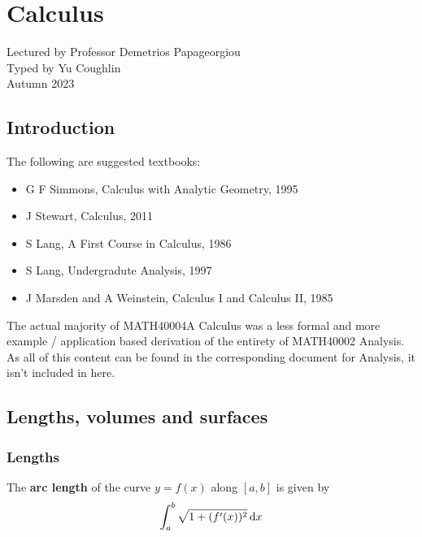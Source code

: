 \documentclass[../Year1.tex]{subfiles}
\begin{document}
\chapter{Calculus}
\renewcommand*\thesection{\arabic{section}}
Lectured by Professor Demetrios Papageorgiou \\ Typed by Yu Coughlin \\
Autumn 2023

\section*{Introduction}


The following are suggested textbooks:
\begin{itemize}
    \item G F Simmons, Calculus with Analytic Geometry, 1995
    \item J Stewart, Calculus, 2011
    \item S Lang, A First Course in Calculus, 1986
    \item S Lang, Undergradute Analysis, 1997
    \item J Marsden and A Weinstein, Calculus I and Calculus II, 1985
\end{itemize}
\begin{note*}
    The actual majority of MATH40004A Calculus was a less formal and more example / application based derivation of the entirety of MATH40002 Analysis. 
    As all of this content can be found in the corresponding document for Analysis, it isn't included in here.
\end{note*}

\tableofcontents\pagebreak

\section{Lengths, volumes and surfaces}

\subsection{Lengths}

\begin{theorem}
    The \textbf{arc length} of the curve $y=f(x)$ along $[a,b]$ is given by \[
        \intd{a}{b}{\sqrt{1+(f'(x))^2}}{x}
    \]
\end{theorem}
\end{document}
